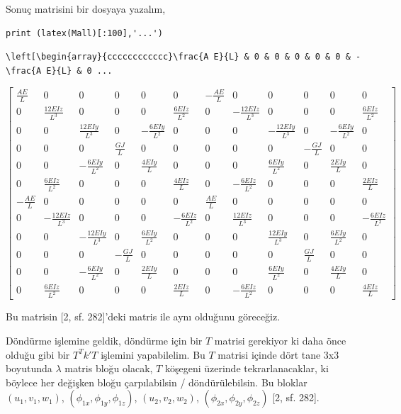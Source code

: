 \documentclass[12pt,fleqn]{article}\usepackage{../../common}
\begin{document}
Sonuç matrisini bir dosyaya yazalım, 

\begin{verbatim}
print (latex(Mall)[:100],'...')
\end{verbatim}

\begin{verbatim}
\left[\begin{array}{cccccccccccc}\frac{A E}{L} & 0 & 0 & 0 & 0 & 0 & - \frac{A E}{L} & 0 ...
\end{verbatim}

$$
\left[\begin{array}{cccccccccccc}\frac{A E}{L} & 0 & 0 & 0 & 0 & 0 & - \frac{A E}{L} & 0 & 0 & 0 & 0 & 0\\0 & \frac{12 E Iz}{L^{3}} & 0 & 0 & 0 & \frac{6 E Iz}{L^{2}} & 0 & - \frac{12 E Iz}{L^{3}} & 0 & 0 & 0 & \frac{6 E Iz}{L^{2}}\\0 & 0 & \frac{12 E Iy}{L^{3}} & 0 & - \frac{6 E Iy}{L^{2}} & 0 & 0 & 0 & - \frac{12 E Iy}{L^{3}} & 0 & - \frac{6 E Iy}{L^{2}} & 0\\0 & 0 & 0 & \frac{G J}{L} & 0 & 0 & 0 & 0 & 0 & - \frac{G J}{L} & 0 & 0\\0 & 0 & - \frac{6 E Iy}{L^{2}} & 0 & \frac{4 E Iy}{L} & 0 & 0 & 0 & \frac{6 E Iy}{L^{2}} & 0 & \frac{2 E Iy}{L} & 0\\0 & \frac{6 E Iz}{L^{2}} & 0 & 0 & 0 & \frac{4 E Iz}{L} & 0 & - \frac{6 E Iz}{L^{2}} & 0 & 0 & 0 & \frac{2 E Iz}{L}\\- \frac{A E}{L} & 0 & 0 & 0 & 0 & 0 & \frac{A E}{L} & 0 & 0 & 0 & 0 & 0\\0 & - \frac{12 E Iz}{L^{3}} & 0 & 0 & 0 & - \frac{6 E Iz}{L^{2}} & 0 & \frac{12 E Iz}{L^{3}} & 0 & 0 & 0 & - \frac{6 E Iz}{L^{2}}\\0 & 0 & - \frac{12 E Iy}{L^{3}} & 0 & \frac{6 E Iy}{L^{2}} & 0 & 0 & 0 & \frac{12 E Iy}{L^{3}} & 0 & \frac{6 E Iy}{L^{2}} & 0\\0 & 0 & 0 & - \frac{G J}{L} & 0 & 0 & 0 & 0 & 0 & \frac{G J}{L} & 0 & 0\\0 & 0 & - \frac{6 E Iy}{L^{2}} & 0 & \frac{2 E Iy}{L} & 0 & 0 & 0 & \frac{6 E Iy}{L^{2}} & 0 & \frac{4 E Iy}{L} & 0\\0 & \frac{6 E Iz}{L^{2}} & 0 & 0 & 0 & \frac{2 E Iz}{L} & 0 & - \frac{6 E Iz}{L^{2}} & 0 & 0 & 0 & \frac{4 E Iz}{L}\end{array}\right]
$$

Bu matrisin [2, sf. 282]'deki matris ile aynı olduğunu göreceğiz.

Döndürme işlemine geldik, döndürme için bir $T$ matrisi gerekiyor ki daha önce
olduğu gibi bir $T^T k' T$ işlemini yapabilelim. Bu $T$ matrisi içinde dört tane
3x3 boyutunda $\lambda$ matris bloğu olacak, $T$ köşegeni üzerinde
tekrarlanacaklar, ki böylece her değişken bloğu çarpılabilsin /
döndürülebilsin. Bu bloklar $(u_1,v_1,w_1)$, $(\phi_{1x},\phi_{1y},\phi_{1z})$,
$(u_2,v_2,w_2)$, $(\phi_{2x},\phi_{2y},\phi_{2z})$ [2, sf. 282].
\end{document}
